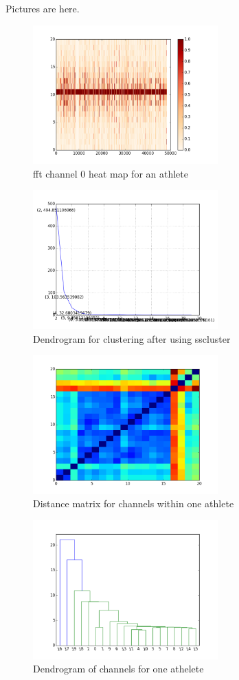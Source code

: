 Pictures are here. 
\begin{figure}
    \centering
    \includegraphics[width=2.8in]{figure/fftwindow.png}
    \caption{fft channel 0 heat map for an athlete}
    \label{fft}
\end{figure}
\begin{figure}
    \centering
    \includegraphics[width=2.8in]{figure/sscluster.png}
    \caption{Dendrogram for clustering after using sscluster}
    \label{sscluster}
\end{figure}
\begin{figure}
    \centering
    \includegraphics[width=2.8in]{figure/distance.png}
    \caption{Distance matrix for channels within one athlete}
    \label{athelet_distance}
\end{figure}
\begin{figure}
    \centering
    \includegraphics[width=2.8in]{figure/single1.png}
    \caption{Dendrogram of channels for one athelete}
    \label{athelet_dendrogram1}
\end{figure}
